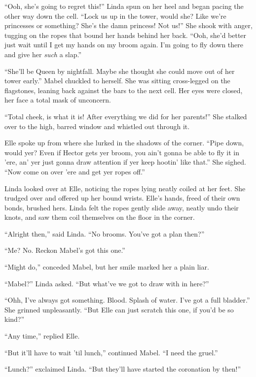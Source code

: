 
``Ooh, she's going to regret this!''
Linda spun on her heel and began pacing the other way down the cell.
``Lock us up in the tower, would she?
Like we're princesses or something?
She's the damn princess!
Not us!''
She shook with anger, tugging on the ropes that bound her hands behind her back.
``Ooh, she'd better just wait until I get my hands on my broom again.
I'm going to fly down there and give her \emph{such} a slap.''

``She'll be Queen by nightfall.
Maybe she thought she could move out of her tower early.''
Mabel chuckled to herself.
She was sitting cross-legged on the flagstones, leaning back against the bars to the next cell.
Her eyes were closed, her face a total mask of unconcern.

``Total cheek, is what it is!
After everything we did for her parents!''
She stalked over to the high, barred window and whistled out through it.

Elle spoke up from where she lurked in the shadows of the corner.
``Pipe down, would yer?
Even if Hector gets yer broom, you ain't gonna be able to fly it in 'ere, an' yer just gonna draw attention if yer keep hootin' like that.''
She sighed.
``Now come on over 'ere and get yer ropes off.''

Linda looked over at Elle, noticing the ropes lying neatly coiled at her feet.
She trudged over and offered up her bound wrists.
Elle's hands, freed of their own bonds, brushed hers.
Linda felt the ropes gently slide away, neatly undo their knots, and saw them coil themselves on the floor in the corner.

``Alright then,'' said Linda.
``No brooms.
You've got a plan then?''

``Me?
No.
Reckon Mabel's got this one.''

``Might do,'' conceded Mabel, but her smile marked her a plain liar.

``Mabel?'' Linda asked.
``But what've we got to draw with in here?''

``Ohh, I've always got something.
Blood.
Splash of water.
I've got a full bladder.''
She grinned unpleasantly.
``But Elle can just scratch this one, if you'd be so kind?''

``Any time,'' replied Elle.

``But it'll have to wait 'til lunch,'' continued Mabel.
``I need the gruel.''

``Lunch?'' exclaimed Linda.
``But they'll have started the coronation by then!''

